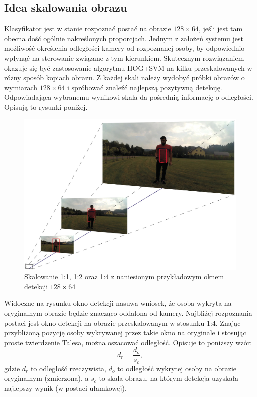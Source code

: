 \subsection{Idea skalowania obrazu}
Klasyfikator jest w stanie rozpoznać postać na obrazie $128\times 64$, jeśli jest tam obecna dość ogólnie nakreślonych proporcjach. Jednym z założeń systemu jest możliwość określenia odległości kamery od rozpoznanej osoby, by odpowiednio wpłynąć na sterowanie związane z tym kierunkiem. Skutecznym rozwiązaniem okazuje się być zastosowanie algorytmu HOG+SVM na kilku przeskalowanych w różny sposób kopiach obrazu. Z każdej skali należy wydobyć próbki obrazów o wymiarach $128\times 64$ i spróbować znaleźć najlepszą pozytywną detekcję. Odpowiadająca wybranemu wynikowi skala da pośrednią informację o odległości. Opisują to rysunki poniżej.
\begin{figure}[h]
	\centering
	\captionsetup{justification=centering,margin=1cm}
	\hspace*{0cm}
	\includegraphics[width=15.5cm]{3_scaling.jpg}
	\caption{Skalowanie 1:1, 1:2 oraz 1:4 z naniesionym przykładowym oknem detekcji $128 \times 64$}
	\label{fig:HOG_image_examples}
\end{figure}
\newline
Widoczne na rysunku okno detekcji nasuwa wniosek, że osoba wykryta na oryginalnym obrazie będzie znacząco oddalona od kamery. Najbliżej rozpoznania postaci jest okno detekcji na obrazie przeskalowanym w stosunku 1:4.
Znając przybliżoną pozycję osoby wykrywanej przez takie okno na oryginale i stosując proste twierdzenie Talesa, można oszacować odległość. Opisuje to poniższy wzór:
\begin{equation}
\label{eq:scaling}
d_r=\frac{d_o}{s_c},
\end{equation}
gdzie $d_r$ to odległość rzeczywista, $d_o$ to odległość wykrytej osoby na obrazie oryginalnym (zmierzona), a $s_c$ to skala obrazu, na którym detekcja uzyskała najlepszy wynik (w postaci ułamkowej).

